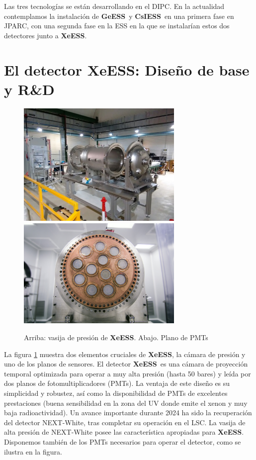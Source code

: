 \documentclass[12pt,a4paper,article]{report} %
\def\xess{{\bf XeESS}}
\def\gess{{\bf GeESS}}
\def\cess{{\bf CsIESS}}
\begin{document}
Las tres tecnologías se están desarrollando en el DIPC. En la actualidad contemplamos la instalación de \gess\ y \cess\ en una primera fase en JPARC, con una segunda fase en la ESS en la que se instalarían estos dos detectores junto a  \xess.

\section*{El detector \xess: Diseño de base y R\&D}

\begin{figure}[bht!]
\begin{center}
\includegraphics[width=8cm]{img/vessel2.jpg}
\includegraphics[width=8cm]{img/ep-new.jpg}

\caption{Arriba: vasija de presión de \xess. Abajo. Plano de PMTs}
\label{fig:xess}
\end{center}
\end{figure}

La figura \ref{fig:xess} muestra dos elementos cruciales de \xess, la cámara de presión y uno de los planos de sensores. El detector \xess\ es una cámara de proyección temporal optimizada para operar a muy alta presión (hasta 50 bares) y leída por dos planos de fotomultiplicadores (PMTs). La ventaja de este diseño es su simplicidad y robustez, así como la disponibilidad de PMTs de excelentes prestaciones (buena sensibilidad en la zona del UV donde emite el xenon y muy baja radioactividad). Un avance importante durante 2024 ha sido la recuperación del detector NEXT-White, tras completar su operación en el LSC. La vasija de alta presión de NEXT-White posee las característica apropiadas para \xess. Disponemos también de los PMTs necesarios para operar el detector, como se ilustra en la figura.
\end{document}
